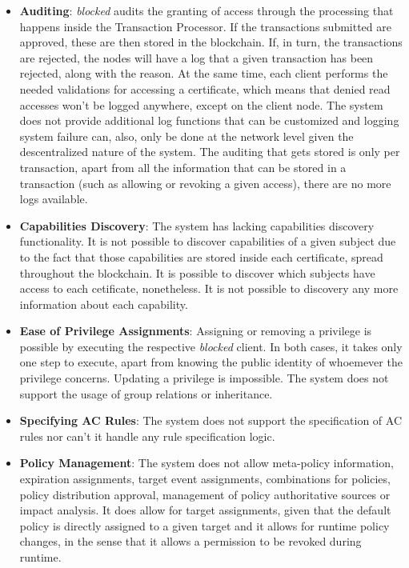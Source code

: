 \begin{itemize}
	\item \textbf{Auditing}: \textit{blocked} audits the granting of access through the processing that happens inside the Transaction Processor. If the transactions submitted are approved, these are then stored in the blockchain. If, in turn, the transactions are rejected, the nodes will have a log that a given transaction has been rejected, along with the reason. At the same time, each client performs the needed validations for accessing a certificate, which means that denied read accesses won't be logged anywhere, except on the client node. The system does not provide additional log functions that can be customized and logging system failure can, also, only be done at the network level given the descentralized nature of the system. The auditing that gets stored is only per transaction, apart from all the information that can be stored in a transaction (such as allowing or revoking a given access), there are no more logs available.
	\item \textbf{Capabilities Discovery}: The system has lacking capabilities discovery functionality. It is not possible to discover capabilities of a given subject due to the fact that those capabilities are stored inside each certificate, spread throughout the blockchain. It is possible to discover which subjects have access to each cetificate, nonetheless. It is not possible to discovery any more information about each capability.
	\item \textbf{Ease of Privilege Assignments}: Assigning or removing a privilege is possible by executing the respective \textit{blocked} client. In both cases, it takes only one step to execute, apart from knowing the public identity of whoemever the privilege concerns. Updating a privilege is impossible. The system does not support the usage of group relations or inheritance.
	\item \textbf{Specifying AC Rules}: The system does not support the specification of AC rules nor can't it handle any rule specification logic.
	\item \textbf{Policy Management}: The system does not allow meta-policy information, expiration assignments, target event assignments, combinations for policies, policy distribution approval, management of policy authoritative sources or impact analysis. It does allow for target assignments, given that the default policy is directly assigned to a given target and it allows for runtime policy changes, in the sense that it allows a permission to be revoked during runtime.

\end{itemize}
